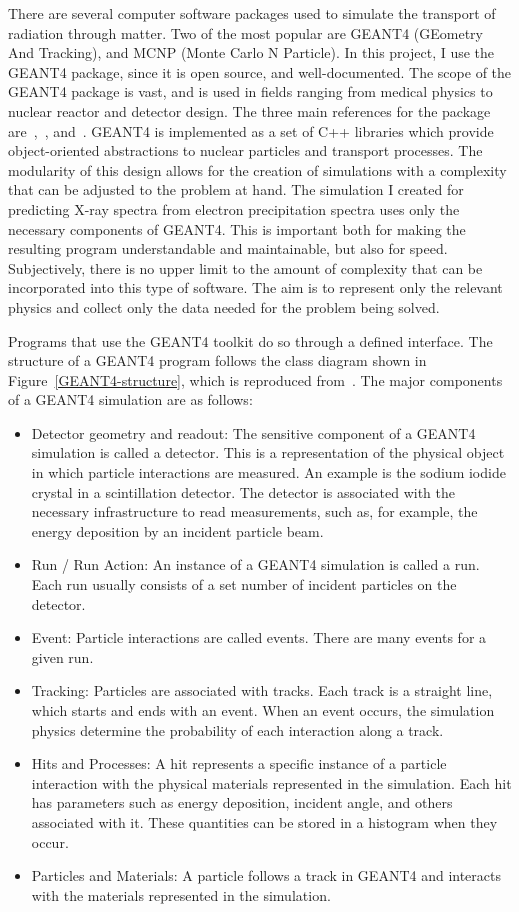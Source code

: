 There are several computer software packages used to simulate the transport of radiation through matter. Two of the most  popular are GEANT4 (GEometry And Tracking), and MCNP (Monte Carlo N Particle). In this project, I use the GEANT4 package, since it is open source, and well-documented. The scope of the GEANT4 package is vast, and is used in fields ranging from medical physics to nuclear reactor and detector design. The three main references for the package are~\citet{Agostinelli2003},~\citet{Allison2006}, and~\citet{Allison2016}. GEANT4 is implemented as a set of C++ libraries which provide object-oriented abstractions to nuclear particles and transport processes.  The modularity of this design allows for the creation of simulations with a complexity that can be adjusted to the problem at hand. The simulation I created for predicting X-ray spectra from electron precipitation spectra uses only the necessary components of GEANT4. This is important both for making the resulting program understandable and maintainable, but also for speed. Subjectively, there is no upper limit to the amount of complexity that can be incorporated into this type of software. The aim is to represent only the relevant physics and collect only the data needed for the problem being solved. 

Programs that use the GEANT4 toolkit do so through a defined interface. The structure of a GEANT4 program follows the class diagram shown in Figure~\ref{GEANT4-structure}, which is reproduced from~\citet{Pfeier:519005}. The major components of a GEANT4 simulation are as follows:

\begin{itemize}
\item Detector geometry and readout: The sensitive component of a GEANT4 simulation is called a detector. This is a representation of the physical object in which particle interactions are measured. An example is the sodium iodide crystal in a scintillation detector. The detector is associated with the necessary infrastructure to read measurements, such as, for example, the energy deposition by an incident particle beam.
\item Run / Run Action: An instance of a GEANT4 simulation is called a run. Each run usually consists of a set number of incident particles on the detector.
\item Event: Particle interactions are called events. There are many events for a given run.
\item Tracking: Particles are associated with tracks. Each track is a straight line, which starts and ends with an event. When an event occurs, the simulation physics determine the probability of each interaction along a track.
\item Hits and Processes: A hit represents a specific instance of a particle interaction with the physical materials represented in the simulation. Each hit has parameters such as energy deposition, incident angle, and others associated with it. These quantities can be stored in a histogram when they occur. 
\item Particles and Materials: A particle follows a track in GEANT4 and interacts with the materials represented in the simulation. 
\end{itemize}
 
